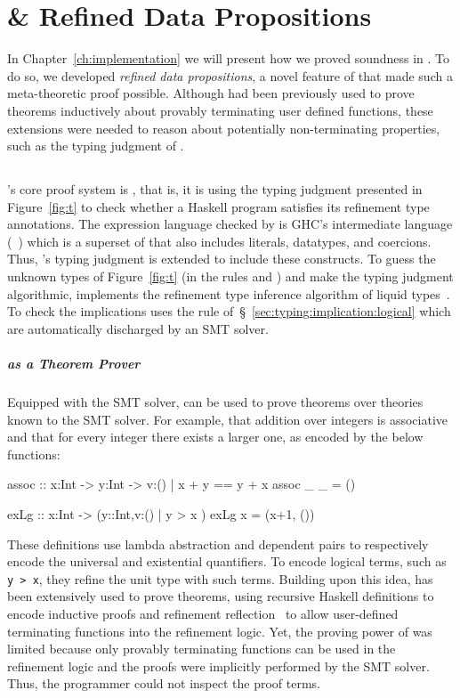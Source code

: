 \chapter{\lh \& Refined Data Propositions}
\label{ch:data-props}

In Chapter~\ref{ch:implementation} we will present how 
we proved 
\sysrf soundness in \lh. 
%
To do so, we developed \textit{refined data propositions}, 
a novel feature of \lh that made such 
a meta-theoretic proof possible. 
Although \lh had been previously used to prove theorems
inductively about provably terminating user defined 
functions, these extensions were needed to 
reason about potentially non-terminating properties, 
such as the typing judgment of \sysrf.


\section{\lh}
\lh's core proof system is \sysrf, 
that is, it is using the typing judgment 
presented in Figure~\ref{fig:t} to check whether a Haskell program 
satisfies its refinement type annotations.
%
The expression language checked by \lh is GHC's intermediate language 
(\coresyn~\cite{coresyn}) which is a superset of \sysrf that also includes 
literals, datatypes, and coercions. Thus, \lh's typing judgment is extended to 
include these constructs. 
%
To guess the unknown types of Figure~\ref{fig:t} (\ie in the rules \tSub and \tLet)
and make the typing judgment algorithmic,
\lh  implements the refinement type inference algorithm of 
liquid types~\cite{LiquidPLDI08}.
%
To check the implications \lh uses the \iLog 
rule of~\S~\ref{sec:typing:implication:logical}
which are automatically discharged by an SMT solver.

\paragraph{\lh as a Theorem Prover}
Equipped with the SMT solver, \lh can be used to prove theorems 
over theories known to the SMT solver.
For example, that addition over integers is associative 
and that for every integer there exists a larger one, 
as encoded by the below functions: 
\begin{mcode}
  assoc :: x:Int -> y:Int -> {v:() | x + y == y + x } 
  assoc _ _ = () 
  
  exLg :: x:Int -> (y::Int,{v:() | y > x })
  exLg x = (x+1, ())   
\end{mcode}
%
These definitions use lambda abstraction and dependent pairs 
to respectively encode the universal and existential quantifiers.
To encode logical terms, such as \texttt{y > x}, they refine the unit type 
with such terms. 
Building upon this idea, \lh has been extensively used 
to prove theorems, using recursive Haskell definitions to 
encode inductive proofs and refinement reflection~\cite{Vazou18}
to allow user-defined terminating functions into the refinement logic. 
Yet, the proving power of \lh was limited because 
only provably terminating functions can be used in the refinement logic
and the proofs were implicitly performed by the SMT solver.  
Thus, the programmer could not inspect the proof terms. 

